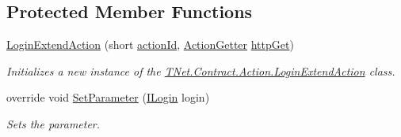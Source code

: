 \subsection*{Protected Member Functions}
\begin{DoxyCompactItemize}
\item 
\mbox{\hyperlink{class_t_net_1_1_contract_1_1_action_1_1_login_extend_action_aa5de5e8a12a59797fdf4607da31ef3d9}{Login\+Extend\+Action}} (short \mbox{\hyperlink{class_t_net_1_1_service_1_1_game_struct_a8c3c761a891a0da9d72d17d34a0f7446}{action\+Id}}, \mbox{\hyperlink{class_t_net_1_1_service_1_1_action_getter}{Action\+Getter}} \mbox{\hyperlink{class_t_net_1_1_service_1_1_base_struct_a04c1171f14d9ee44612f9966a8d61d30}{http\+Get}})
\begin{DoxyCompactList}\small\item\em Initializes a new instance of the \mbox{\hyperlink{class_t_net_1_1_contract_1_1_action_1_1_login_extend_action}{T\+Net.\+Contract.\+Action.\+Login\+Extend\+Action}} class. \end{DoxyCompactList}\item 
override void \mbox{\hyperlink{class_t_net_1_1_contract_1_1_action_1_1_login_extend_action_a1d6f667177382314d1e9ee12180b65ea}{Set\+Parameter}} (\mbox{\hyperlink{interface_t_net_1_1_sns_1_1_i_login}{I\+Login}} login)
\begin{DoxyCompactList}\small\item\em Sets the parameter. \end{DoxyCompactList}\end{DoxyCompactItemize}
